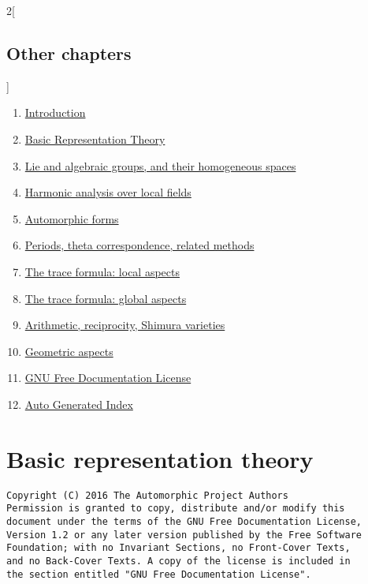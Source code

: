 \documentclass[oneside]{stacks-project-book}
\theoremstyle{plain}
\theoremstyle{definition}
\theoremstyle{remark}
\numberwithin{equation}{subsection}
\begin{document}
\begin{multicols}{2}[\section{Other chapters}]
\noindent
\begin{enumerate}
\item \hyperref[introduction-section-phantom]{Introduction}
\item \hyperref[representationtheory-section-phantom]{Basic Representation Theory}
\item \hyperref[algebraicgroups-section-phantom]{Lie and algebraic groups, and their homogeneous spaces}
\item \hyperref[harmonicanalysis-section-phantom]{Harmonic analysis over local fields}
\item \hyperref[automorphicforms-section-phantom]{Automorphic forms}
\item \hyperref[periods-section-phantom]{Periods, theta correspondence, related methods}
\item \hyperref[traceformulalocal-section-phantom]{The trace formula: local aspects}
\item \hyperref[traceformulaglobal-section-phantom]{The trace formula: global aspects}
\item \hyperref[arithmetic-section-phantom]{Arithmetic, reciprocity, Shimura varieties}
\item \hyperref[geometric-section-phantom]{Geometric aspects}
\item \hyperref[fdl-section-phantom]{GNU Free Documentation License}
\item \hyperref[index-section-phantom]{Auto Generated Index}
\end{enumerate}
\end{multicols}

%

\chapter{Basic representation theory}



\label{representationtheory-section-phantom}
\hypertarget{0100}{}
\reversemarginpar{}

\begin{verbatim}
Copyright (C) 2016 The Automorphic Project Authors
Permission is granted to copy, distribute and/or modify this
document under the terms of the GNU Free Documentation License,
Version 1.2 or any later version published by the Free Software
Foundation; with no Invariant Sections, no Front-Cover Texts,
and no Back-Cover Texts. A copy of the license is included in
the section entitled "GNU Free Documentation License".
\end{verbatim}
\end{document}
